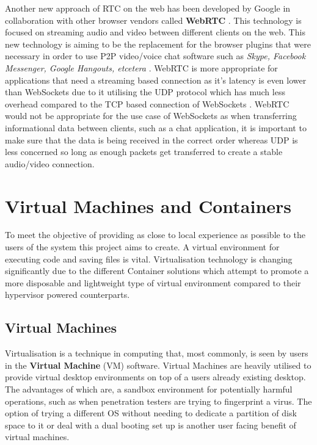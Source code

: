 Another new approach of RTC on the web has been developed by Google in collaboration with other browser vendors called \textbf{WebRTC} \cite{webrtc}. This technology is focused on streaming audio and video between different clients on the web. This new technology is aiming to be the replacement for the browser plugins that were necessary in order to use P2P video/voice chat software such as \textit{Skype, Facebook Messenger, Google Hangouts, etcetera} \cite{webrtc}. WebRTC is more appropriate for applications that need a streaming based connection as it's latency is even lower than WebSockets due to it utilising the UDP protocol which has much less overhead compared to the TCP based connection of WebSockets \cite{udpvstcp}. WebRTC would not be appropriate for the use case of WebSockets as when transferring informational data between clients, such as a chat application, it is important to make sure that the data is being received in the correct order whereas UDP is less concerned so long as enough packets get transferred to create a stable audio/video connection.

\section{Virtual Machines and Containers} \label{lit-containers}

To meet the objective of providing as close to local experience as possible to the users of the system this project aims to create. A virtual environment for executing code and saving files is vital. Virtualisation technology is changing significantly due to the different Container solutions which attempt to promote a more disposable and lightweight type of virtual environment compared to their hypervisor powered counterparts.

\subsection{Virtual Machines}

Virtualisation is a technique in computing that, most commonly, is seen by users in the \textbf{Virtual Machine} (VM) software. Virtual Machines are heavily utilised to provide virtual desktop environments on top of a users already existing desktop. The advantages of which are, a sandbox environment for potentially harmful operations, such as when penetration testers are trying to fingerprint a virus. The option of trying a different OS without needing to dedicate a partition of disk space to it or deal with a dual booting set up is another user facing benefit of virtual machines.


